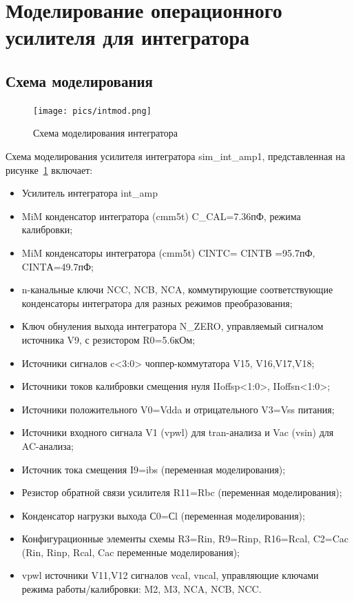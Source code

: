 \documentclass[a4paper,12pt,oneside]{scrartcl}
\begin{document}
\clearpage






\section{Моделирование операционного усилителя для интегратора}
\subsection{Схема моделирования}

\begin{figure}[!htb]
\centering
\texttt{[image: pics/intmod.png]}
\caption{Схема моделирования интегратора}
\label{fig:intmod}
\end{figure}

Схема моделирования усилителя интегратора sim\_int\_amp1, представленная на рисунке~\ref{fig:intmod} включает:

\begin{itemize}
    \item Усилитель интегратора int\_amp
    \item MiM конденсатор интегратора (cmm5t)   C\_CAL=7.36пФ, режима калибровки;
    \item MiM конденсаторы интегратора (cmm5t)   CINTC= CINTВ =95.7пФ, CINTА=49.7пФ;
    \item n-канальные ключи NCC, NCB, NCA, коммутирующие соответствующие конденсаторы интегратора для разных режимов преобразования;
    \item Ключ обнуления выхода интегратора N\_ZERO, управляемый сигналом источника V9, с резистором R0=5.6кОм;
    \item Источники сигналов c<3:0> чоппер-коммутатора V15, V16,V17,V18;
    \item Источники токов калибровки смещения нуля IIoffsp<1:0>, IIoffsn<1:0>;
    \item Источники положительного V0=Vdda и отрицательного V3=Vss  питания;
    \item Источники входного сигнала  V1 (vpwl) для tran-анализа и Vac (vsin) для AC-анализа;
    \item Источник тока смещения I9=ibs (переменная моделирования);
    \item Резистор обратной связи усилителя R11=Rbc (переменная моделирования);
    \item Конденсатор нагрузки выхода С0=Сl  (переменная моделирования);
    \item Конфигурационные элементы схемы R3=Rin, R9=Rinp, R16=Rcal, C2=Cac (Rin, Rinp, Rcal, Cac переменные моделирования);
    \item vpwl источники V11,V12 сигналов vcal, vncal, управляющие ключами режима работы/калибровки: M2, M3, NCA, NCB, NCC.
\end{itemize}
\end{document}
